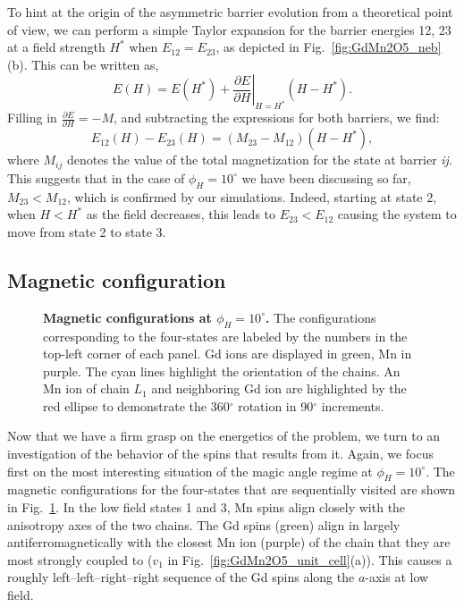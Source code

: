 %
To hint at the origin of the asymmetric barrier evolution from a theoretical point of view, we can perform a simple Taylor expansion for the barrier energies 12, 23 at a field strength $H^*$ when $E_{12} = E_{23}$, as depicted in Fig.~\ref{fig:GdMn2O5_neb}(b).
This can be written as,
\begin{equation}
	E(H) = E(H^*) + \left.\frac{\partial E}{\partial H}\right|_{H=H^*}(H - H^*).
\end{equation}
Filling in $\frac{\partial E}{\partial H} = -M$, and subtracting the expressions for both barriers, we find:
\begin{equation}
	E_{12}(H) - E_{23}(H) = (M_{23} - M_{12})(H - H^*),
\end{equation}
where $M_{ij}$ denotes the value of the total magnetization for the state at barrier {\it ij}.
This suggests that in the case of $\phi_H=10^\circ$ we have been discussing so far, $M_{23} < M_{12}$, which is confirmed by our simulations.
Indeed, starting at state 2, when $H<H^*$ as the field decreases, this leads to $E_{23} < E_{12}$ causing the system to move from state 2 to state 3.

\subsection{Magnetic configuration \label{sec:GdMn2O5_magnetic_configuration}}
\begin{figure}[h!]
    \centering
    \caption{\label{fig:GdMn2O5_spin_configs}{\bf Magnetic configurations at $\phi_H =  10^\circ$.} The configurations corresponding to the four-states are labeled by the numbers in the top-left corner of each panel. Gd ions are displayed in green, Mn in purple. The cyan lines highlight the orientation of the chains. An Mn ion of chain $L_1$ and neighboring Gd ion are highlighted by the red ellipse to demonstrate the 360$^\circ$ rotation in 90$^\circ$ increments.  }
    \label{fig:GdMn2O5_4configs}
\end{figure}
Now that we have a firm grasp on the energetics of the problem, we turn to an investigation of the behavior of the spins that results from it.
Again, we focus first on the most interesting situation of the magic angle regime at $\phi_H=10^\circ$.
The magnetic configurations for the four-states that are sequentially visited are shown in Fig.~\ref{fig:GdMn2O5_4configs}.
In the low field states 1 and 3, Mn spins align closely with the anisotropy axes of the two chains.
The Gd spins (green) align in largely antiferromagnetically with the closest Mn ion (purple) of the chain that they are most strongly coupled to ($v_1$ in Fig.~\ref{fig:GdMn2O5_unit_cell}(a)).
This causes a roughly left--left--right--right sequence of the Gd spins along the $a$-axis at low field. 

